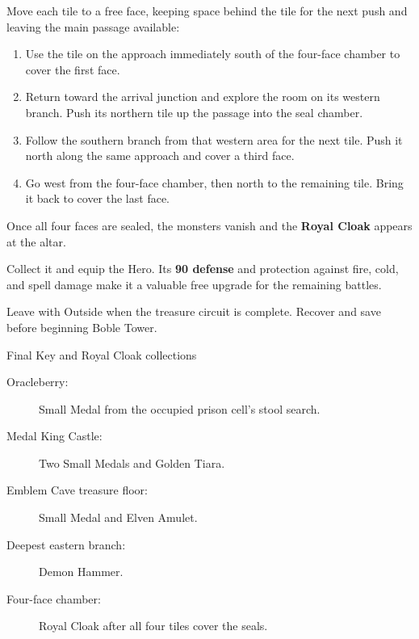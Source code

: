 Move each tile to a free face, keeping space behind the tile
for the next push and leaving the main passage available:
\begin{enumerate}
  \item Use the tile on the approach immediately south of
    the four-face chamber to cover the first face.
  \item Return toward the arrival junction and explore the
    room on its western branch. Push its northern tile up
    the passage into the seal chamber.
  \item Follow the southern branch from that western area
    for the next tile. Push it north along the same approach
    and cover a third face.
  \item Go west from the four-face chamber, then north to
    the remaining tile. Bring it back to cover the last face.
\end{enumerate}

Once all four faces are sealed, the monsters vanish and
the \textbf{Royal Cloak} appears at the altar.


Collect it and equip the Hero. Its \textbf{90 defense} and protection
against fire, cold, and spell damage make it a valuable
free upgrade for the remaining battles.



Leave with Outside when the treasure circuit is complete.
Recover and save before beginning Boble Tower.

\begin{routecheck}{Final Key and Royal Cloak collections}
\begin{description}
  \item[Oracleberry:] Small Medal from the occupied prison cell's
    stool search.
  \item[Medal King Castle:] Two Small Medals and Golden Tiara.
  \item[Emblem Cave treasure floor:] Small Medal and Elven Amulet.
  \item[Deepest eastern branch:] Demon Hammer.
  \item[Four-face chamber:] Royal Cloak after all four tiles
    cover the seals.
\end{description}
\end{routecheck}


